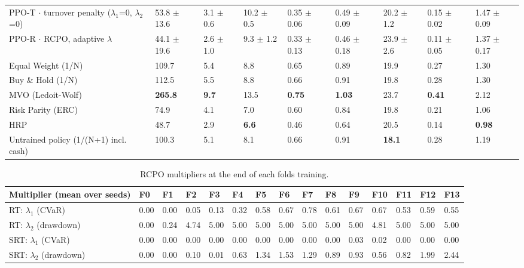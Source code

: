 \documentclass[11pt]{article}
\begin{document}
\begin{table}[!htbp]
\begin{adjustbox}{max width=\linewidth}
\begin{tabular}{@{}lllllllll@{}}
PPO-T $\cdot$ turnover penalty {($\lambda_1$=0, $\lambda_2$=0)} & 53.8{ $\pm$ 13.6} & 3.1{ $\pm$ 0.6} & 10.2{ $\pm$ 0.5} & 0.35{ $\pm$ 0.06} & 0.49{ $\pm$ 0.09} & 20.2{ $\pm$ 1.2} & 0.15{ $\pm$ 0.02} & 1.47{ $\pm$ 0.09} \\
PPO-R $\cdot$ RCPO, adaptive $\lambda$ & 44.1{ $\pm$ 19.6} & 2.6{ $\pm$ 1.0} & 9.3{ $\pm$ 1.2} & 0.33{ $\pm$ 0.13} & 0.46{ $\pm$ 0.18} & 23.9{ $\pm$ 2.6} & 0.11{ $\pm$ 0.05} & 1.37{ $\pm$ 0.17} \\
Equal Weight (1/N) & 109.7 & 5.4 & 8.8 & 0.65 & 0.89 & 19.9 & 0.27 & 1.30 \\
Buy \& Hold (1/N) & 112.5 & 5.5 & 8.8 & 0.66 & 0.91 & 19.8 & 0.28 & 1.30 \\
MVO (Ledoit-Wolf) & \textbf{265.8} & \textbf{9.7} & 13.5 & \textbf{0.75} & \textbf{1.03} & 23.7 & \textbf{0.41} & 2.12 \\
Risk Parity (ERC) & 74.9 & 4.1 & 7.0 & 0.60 & 0.84 & 19.8 & 0.21 & 1.06 \\
HRP & 48.7 & 2.9 & \textbf{6.6} & 0.46 & 0.64 & 20.5 & 0.14 & \textbf{0.98} \\
Untrained policy (1/(N+1) incl. cash) & 100.3 & 5.1 & 8.1 & 0.66 & 0.91 & \textbf{18.1} & 0.28 & 1.19 \\
\bottomrule
\end{tabular}
\end{adjustbox}
\end{table}

\begin{table}[!htbp]
\centering\scriptsize
\caption{RCPO multipliers at the end of each fold\textquotesingle s training.\label{tab-lagrangian-fu}}
\begin{adjustbox}{max width=\linewidth}
\begin{tabular}{@{}lllllllllllllll@{}}
\toprule
Multiplier (mean over seeds) & F0 & F1 & F2 & F3 & F4 & F5 & F6 & F7 & F8 & F9 & F10 & F11 & F12 & F13 \\
\midrule
RT: $\lambda_1$ (CVaR) & 0.00 & 0.00 & 0.05 & 0.13 & 0.32 & 0.58 & 0.67 & 0.78 & 0.61 & 0.67 & 0.67 & 0.53 & 0.59 & 0.55 \\
RT: $\lambda_2$ (drawdown) & 0.00 & 0.24 & 4.74 & 5.00 & 5.00 & 5.00 & 5.00 & 5.00 & 5.00 & 5.00 & 4.81 & 5.00 & 5.00 & 5.00 \\
SRT: $\lambda_1$ (CVaR) & 0.00 & 0.00 & 0.00 & 0.00 & 0.00 & 0.00 & 0.00 & 0.00 & 0.00 & 0.03 & 0.02 & 0.00 & 0.00 & 0.00 \\
SRT: $\lambda_2$ (drawdown) & 0.00 & 0.00 & 0.10 & 0.01 & 0.63 & 1.34 & 1.53 & 1.29 & 0.89 & 0.93 & 0.56 & 0.82 & 1.99 & 2.44 \\
\bottomrule
\end{tabular}
\end{adjustbox}
\end{table}
\end{document}

